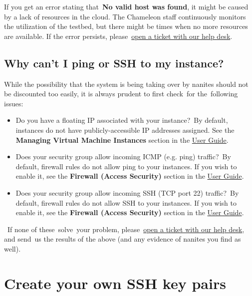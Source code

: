 If you get an error stating that~\textbf{No valid host was found}, it
might be caused by a lack of resources in the cloud. The Chameleon staff
continuously monitors the utilization of the testbed, but there might be
times when no more resources are available. If the error persists,
please~\href{https://www.chameleoncloud.org/user/help/}{open a ticket
with our help desk}.

\subsection{Why can't I ping or SSH to my
instance?}\label{why-cant-i-ping-or-ssh-to-my-instance}

While the possibility that the system is being taking over by nanites
should not be discounted too easily, it is always prudent to first
check~for the~following issues:

\begin{itemize}
\tightlist
\item
  Do you have a floating IP associated with your instance?~By default,
  instances do not have publicly-accessible IP addresses assigned. See
  the \textbf{Managing Virtual Machine Instances} section in the
  \href{https://www.chameleoncloud.org/docs/user-guides/openstack-kvm-user-guide/}{User
  Guide}.
\item
  Does your security group allow incoming ICMP (e.g. ping) traffic?~By
  default, firewall rules do not allow ping to your instances. If you
  wish to enable it, see the \textbf{Firewall (Access Security)} section
  in the
  \href{https://www.chameleoncloud.org/docs/user-guides/openstack-kvm-user-guide/}{User
  Guide}.
\item
  Does your security group allow incoming SSH (TCP port 22) traffic?~By
  default, firewall rules do not allow SSH to your instances. If you
  wish to enable it, see the \textbf{Firewall (Access Security)} section
  in the
  \href{https://www.chameleoncloud.org/docs/user-guides/openstack-kvm-user-guide/}{User
  Guide}.
\end{itemize}

~If none of these~solve~your problem,
please~\href{https://www.chameleoncloud.org/user/help/}{open a ticket
with our help desk}, and send~us the results of the above (and any
evidence of nanites you find as well).

\section{Create your own SSH key
pairs}\label{create-your-own-ssh-key-pairs}

